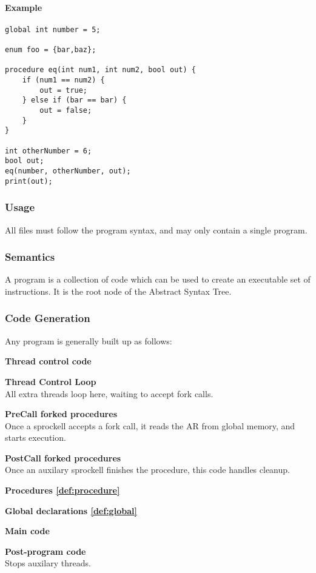 \documentclass[twoside]{report}
\begin{document}
\paragraph{Example}
\begin{verbatim}
global int number = 5;

enum foo = {bar,baz};

procedure eq(int num1, int num2, bool out) {
	if (num1 == num2) {
		out = true;
	} else if (bar == bar) {
		out = false;
	}
}

int otherNumber = 6;
bool out;
eq(number, otherNumber, out);
print(out);
\end{verbatim}
\subsubsection*{Usage}
All files must follow the program syntax, and may only contain a single program.
\subsubsection*{Semantics}
A program is a collection of code which can be used to create an executable set of instructions. It is the root node of the Abstract Syntax Tree.
\subsubsection*{Code Generation}
Any program is generally built up as follows:
\begin{compactitem}
	\item \textbf{Thread control code}
	\begin{compactitem}
		\item \textbf{Thread Control Loop} \\ All extra threads loop here, waiting to accept fork calls.
		\item \textbf{PreCall forked procedures} \\ Once a sprockell accepts a fork call, it reads the AR from global memory, and starts execution.
		\item \textbf{PostCall forked procedures} \\ Once an auxilary sprockell finishes the procedure, this code handles cleanup.
	\end{compactitem}
	\item \textbf{Procedures \ref{def:procedure}}
	\item \textbf{Global declarations \ref{def:global}}
	\item \textbf{Main code}
	
	\item \textbf{Post-program code} \\ Stops auxilary threads.
\end{compactitem}
\end{document}
